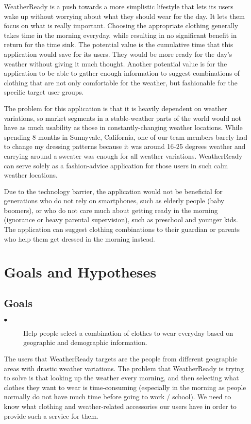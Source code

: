 \documentclass{sigchi}
\begin{document}
WeatherReady is a push towards a more simplistic lifestyle that lets its users wake up without worrying about what they should wear for the day. It lets them focus on what is really important. Choosing the appropriate clothing generally takes time in the morning everyday, while resulting in no significant benefit in return for the time sink. The potential value is the cumulative time that this application would save for its users. They would be more ready for the day's weather without giving it much thought. Another potential value is for the application to be able to gather enough information to suggest combinations of clothing that are not only comfortable for the weather, but fashionable for the specific target user groups.

The problem for this application is that it is heavily dependent on weather variations, so market segments in a stable-weather parts of the world would not have as much usability as those in constantly-changing weather locations. While spending 8 months in Sunnyvale, California, one of our team members barely had to change my dressing patterns because it was around 16-25 degrees weather and carrying around a sweater was enough for all weather variations. WeatherReady can serve solely as a fashion-advice application for those users in such calm weather locations.

Due to the technology barrier, the application would not be beneficial for generations who do not rely on smartphones, such as elderly people (baby boomers), or who do not care much about getting ready in the morning (ignorance or heavy parental supervision), such as preschool and younger kids. The application can suggest clothing combinations to their guardian or parents who help them get dressed in the morning instead.


\section{Goals and Hypotheses}
\subsection{Goals}
\begin{description}
\item[$\bullet$] Help people select a combination of clothes to wear everyday based on geographic and demographic information. 
\end{description}
The users that WeatherReady targets are the people from different geographic areas with drastic weather variations. The problem that WeatherReady is trying to solve is that looking up the weather every morning, and then selecting what clothes they want to wear is time-consuming (especially in the morning as people normally do not have much time before going to work / school). We need to know what clothing and weather-related accessories our users have in order to provide such a service for them.
\end{document}
